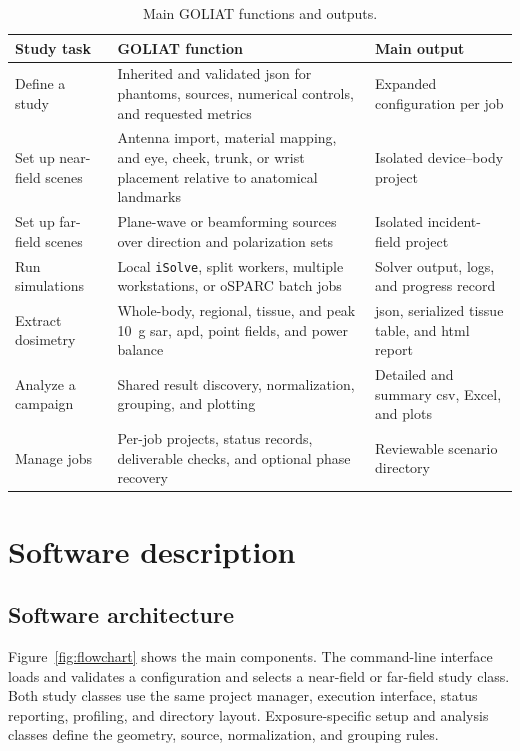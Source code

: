\documentclass[final,5p,times,twocolumn]{elsarticle}
\begin{document}
\begin{table}[!ht]
\centering
\small
\begin{tabularx}{\textwidth}{@{}>{\raggedright\arraybackslash}p{}>{\raggedright\arraybackslash}p{}>{\raggedright\arraybackslash}X@{}}
\toprule
Study task & GOLIAT function & Main output \\
\midrule
Define a study & Inherited and validated \gls{json} for phantoms, sources, numerical controls, and requested metrics & Expanded configuration per job \\
Set up near-field scenes & Antenna import, material mapping, and eye, cheek, trunk, or wrist placement relative to anatomical landmarks & Isolated device--body project \\
Set up far-field scenes & Plane-wave or beamforming sources over direction and polarization sets & Isolated incident-field project \\
Run simulations & Local \texttt{iSolve}, split workers, multiple workstations, or oSPARC batch jobs & Solver output, logs, and progress record \\
Extract dosimetry & Whole-body, regional, tissue, and peak 10~g \gls{sar}, \gls{apd}, point fields, and power balance & \gls{json}, serialized tissue table, and \gls{html} report \\
Analyze a campaign & Shared result discovery, normalization, grouping, and plotting & Detailed and summary \gls{csv}, Excel, and plots \\
Manage jobs & Per-job projects, status records, deliverable checks, and optional phase recovery & Reviewable scenario directory \\
\bottomrule
\end{tabularx}
\caption{Main GOLIAT functions and outputs.}
\label{tab:capabilities}
\end{table}

\section{Software description}

\subsection{Software architecture}

Figure~\ref{fig:flowchart} shows the main components. The command-line interface loads and validates a configuration and selects a near-field or far-field study class. Both study classes use the same project manager, execution interface, status reporting, profiling, and directory layout. Exposure-specific setup and analysis classes define the geometry, source, normalization, and grouping rules.
\end{document}
